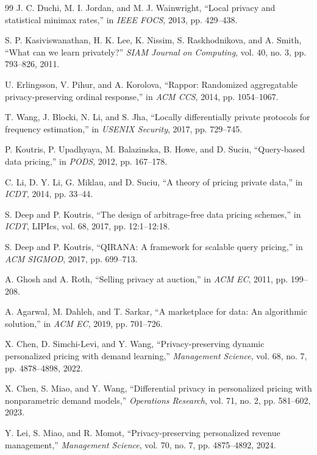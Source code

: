 \documentclass[conference]{IEEEtran}
\begin{document}
\begin{thebibliography}{99}
J. C. Duchi, M. I. Jordan, and M. J. Wainwright, ``Local privacy and statistical minimax rates,'' in \emph{IEEE FOCS}, 2013, pp. 429--438.

S. P. Kasiviswanathan, H. K. Lee, K. Nissim, S. Raskhodnikova, and A. Smith, ``What can we learn privately?'' \emph{SIAM Journal on Computing}, vol. 40, no. 3, pp. 793--826, 2011.

U. Erlingsson, V. Pihur, and A. Korolova, ``Rappor: Randomized aggregatable privacy-preserving ordinal response,'' in \emph{ACM CCS}, 2014, pp. 1054--1067.

T. Wang, J. Blocki, N. Li, and S. Jha, ``Locally differentially private protocols for frequency estimation,'' in \emph{USENIX Security}, 2017, pp. 729--745.

P. Koutris, P. Upadhyaya, M. Balazinska, B. Howe, and D. Suciu, ``Query-based data pricing,'' in \emph{PODS}, 2012, pp. 167--178.

C. Li, D. Y. Li, G. Miklau, and D. Suciu, ``A theory of pricing private data,'' in \emph{ICDT}, 2014, pp. 33--44.

S. Deep and P. Koutris, ``The design of arbitrage-free data pricing schemes,'' in \emph{ICDT}, LIPIcs, vol. 68, 2017, pp. 12:1--12:18.

S. Deep and P. Koutris, ``QIRANA: A framework for scalable query pricing,'' in \emph{ACM SIGMOD}, 2017, pp. 699--713.

A. Ghosh and A. Roth, ``Selling privacy at auction,'' in \emph{ACM EC}, 2011, pp. 199--208.

A. Agarwal, M. Dahleh, and T. Sarkar, ``A marketplace for data: An algorithmic solution,'' in \emph{ACM EC}, 2019, pp. 701--726.

X. Chen, D. Simchi-Levi, and Y. Wang, ``Privacy-preserving dynamic personalized pricing with demand learning,'' \emph{Management Science}, vol. 68, no. 7, pp. 4878--4898, 2022.

X. Chen, S. Miao, and Y. Wang, ``Differential privacy in personalized pricing with nonparametric demand models,'' \emph{Operations Research}, vol. 71, no. 2, pp. 581--602, 2023.

Y. Lei, S. Miao, and R. Momot, ``Privacy-preserving personalized revenue management,'' \emph{Management Science}, vol. 70, no. 7, pp. 4875--4892, 2024.


\end{thebibliography}
\end{document}
